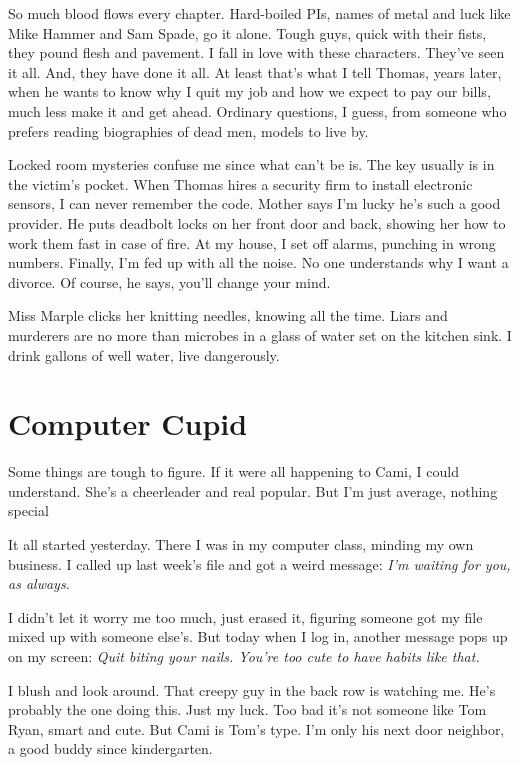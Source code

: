 \documentclass[twoside,10pt]{book}
\begin{document}
So much blood flows every chapter. Hard-boiled PIs, names of metal and
luck like Mike Hammer and Sam Spade, go it alone. Tough guys, quick with
their fists, they pound flesh and pavement. I fall in love with these
characters. They've seen it all. And, they have done it all. At least
that's what I tell Thomas, years later, when he wants to know why I quit
my job and how we expect to pay our bills, much less make it and get
ahead. Ordinary questions, I guess, from someone who prefers reading
biog­raphies of dead men, models to live by.

Locked room mysteries confuse me since what can't be is. The key usually
is in the victim's pocket. When Thomas hires a security firm to install
electronic sensors, I can never remember the code. Mother says I'm lucky
he's such a good provider. He puts deadbolt locks on her front door and
back, showing her how to work them fast in case of fire. At my house, I
set off alarms, punching in wrong numbers. Finally, I'm fed up with all
the noise. No one understands why I want a divorce. Of course, he says,
you'll change your mind.

Miss Marple clicks her knitting needles, knowing all the time. Liars and
murderers are no more than microbes in a glass of water set on the
kitchen sink. I drink gallons of well water, live dangerously.



\cleardoublepage
\chapter{Computer Cupid}

Some things are tough to figure. If it were all happening to Cami, I
could understand. She's a cheerleader and real popular. But I'm just
average, nothing special

It all started yesterday. There I was in my computer class, minding my
own business. I called up last week's file and got a weird message:
\emph{I'm waiting for you, as always.}

I didn't let it worry me too much, just erased it, figuring someone got
my file mixed up with someone else's. But today when I log in, another
message pops up on my screen: \emph{Quit biting your nails. You're too
cute to have habits like that.}

I blush and look around. That creepy guy in the back row is watching me.
He's probably the one doing this. Just my luck. Too bad it's not someone
like Tom Ryan, smart and cute. But Cami is Tom's type. I'm only his next
door neighbor, a good buddy since kindergarten.
\end{document}
